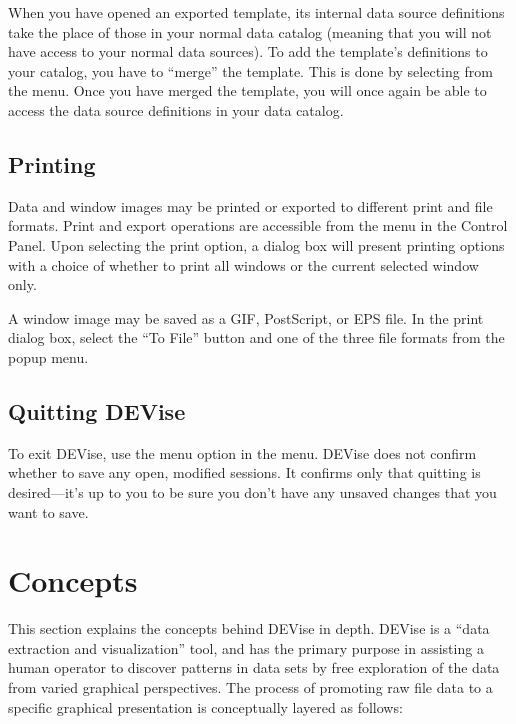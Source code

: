 When you have opened an exported template, its internal data source definitions
take the place of those in your normal data catalog (meaning that you will
not have access to your normal data sources).  To add the template's
definitions to your catalog, you have to ``merge'' the template.  This is
done by selecting  from the  menu.  Once
you have merged the template, you will once again be able to access the data
source definitions in  your data catalog.


\subsection{Printing}

Data and window images may be printed or exported to different print and file
formats. Print and export operations are accessible from the  menu
in the Control Panel. Upon selecting the print option, a dialog box will present
printing options with a choice of whether to print all windows or the current
selected window only.

A window image may be saved as a GIF, PostScript, or EPS file. In the print
dialog box, select the ``To File'' button and one of the three file formats from
the popup menu. 


\subsection{Quitting DEVise}

To exit DEVise, use the  menu option in the  menu.
DEVise does not confirm whether to save any open, modified sessions. It confirms
only that quitting is desired---it's up to you to be sure you don't have any
unsaved changes that you want to save.


\section{Concepts}

This section explains the concepts behind DEVise in depth. DEVise is a ``data
extraction and visualization'' tool, and has the primary purpose in assisting a
human operator to discover patterns in data sets by free exploration of the data
from varied graphical perspectives. The process of promoting raw file data to a
specific graphical presentation is conceptually layered as follows:

